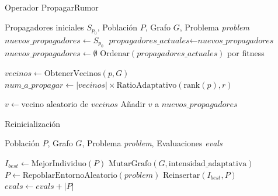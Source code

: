 \documentclass[11pt,a4paper]{article}
\begin{document}
\begin{algorithm}[h!]
\caption{Operador PropagarRumor}
\label{alg:propagate}
\begin{algorithmic}[1]
\Require Propagadores iniciales $S_{p_0}$, Población $P$, Grafo $G$, Problema \textit{problem}
\State $\textit{nuevos\_propagadores} \leftarrow S_{p_0}$
    \State $\textit{propagadores\_actuales} \leftarrow \textit{nuevos\_propagadores}$
    \State $\textit{nuevos\_propagadores} \leftarrow \emptyset$
    \State $\text{Ordenar}(\textit{propagadores\_actuales})$ por fitness
    
        \State $\textit{vecinos} \leftarrow \text{ObtenerVecinos}(p, G)$
        \State $\textit{num\_a\_propagar} \leftarrow |\textit{vecinos}| \times \text{RatioAdaptativo}(\text{rank}(p), r)$
        
            \State $v \leftarrow \text{vecino aleatorio de } \textit{vecinos}$
                \State Añadir $v$ a $\textit{nuevos\_propagadores}$
            \EndIf
        \EndFor
    \EndFor
\EndFor
\end{algorithmic}
\end{algorithm}

\begin{algorithm}[h!]
\caption{Reinicialización}
\label{alg:restart}
\begin{algorithmic}[1]
\Require Población $P$, Grafo $G$, Problema \textit{problem}, Evaluaciones \textit{evals}

     
        \State $I_{best} \leftarrow \text{MejorIndividuo}(P)$
        \State $\text{MutarGrafo}(G, \text{intensidad\_adaptativa})$
        \State $P \leftarrow \text{RepoblarEntornoAleatorio}(\textit{problem})$
        \State $\text{Reinsertar}(I_{best}, P)$
        \State $\textit{evals} \leftarrow \textit{evals} + |P|$
    \EndIf

\end{algorithmic}
\end{algorithm}
\end{document}

